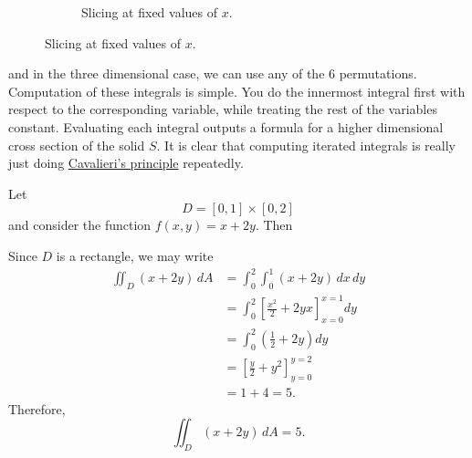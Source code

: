 \begin{figure}[H]
\begin{subfigure}[b]{0.48\textwidth}
      \caption{Slicing at fixed values of $x$.}
    \end{subfigure}
  \end{figure}

  and in the three dimensional case, we can use any of the 6 permutations. Computation of these integrals is simple. You do the innermost integral first with respect to the corresponding variable, while treating the rest of the variables constant. Evaluating each integral outputs a formula for a higher dimensional cross section of the solid $S$. It is clear that computing iterated integrals is really just doing \hyperref[thm:cavalieris-principle]{Cavalieri's principle} repeatedly. 

  \begin{example}
    \label{ex:double-integral-over-a-rectangle-easy}
    Let 
    \begin{equation}
      D = [0,1] \times [0,2]
    \end{equation}
    and consider the function $f(x,y) = x + 2y$. Then 
    \begin{center}
    \end{center}
    Since $D$ is a rectangle, we may write
    \begin{align*}
      \iint_D (x+2y)\,dA
      &= \int_0^2 \int_0^1 (x+2y)\,dx\,dy \\
      &= \int_0^2 \left[ \frac{x^2}{2} + 2yx \right]_{x=0}^{x=1} dy \\
      &= \int_0^2 \left( \frac{1}{2} + 2y \right) dy \\
      &= \left[ \frac{y}{2} + y^2 \right]_{y=0}^{y=2} \\
      &= 1 + 4 = 5.
    \end{align*}
    Therefore,
    \begin{equation}
      \iint_D (x+2y)\,dA = 5.
    \end{equation}
  \end{example}

